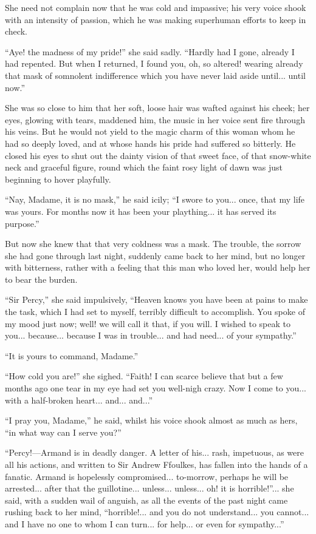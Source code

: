 \documentclass[paper=5.5in:8.5in,BCOR=7mm,twoside,DIV=calc,12pt,usegeometry,chapterprefix,endperiod,headings=big]{scrbook}
\begin{document}
She need not complain now that he was cold and impassive; his very voice shook with an intensity of passion, which he was making superhuman efforts to keep in check.

\enquote{Aye! the madness of my pride!} she said sadly. \enquote{Hardly had I gone, already I had repented. But when I returned, I found you, oh, so altered! wearing already that mask of somnolent indifference which you have never laid aside until... until now.}

She was so close to him that her soft, loose hair was wafted against his cheek; her eyes, glowing with tears, maddened him, the music in her voice sent fire through his veins. But he would not yield to the magic charm of this woman whom he had so deeply loved, and at whose hands his pride had suffered so bitterly. He closed his eyes to shut out the dainty vision of that sweet face, of that snow-white neck and graceful figure, round which the faint rosy light of dawn was just beginning to hover playfully.

\enquote{Nay, Madame, it is no mask,} he said icily; \enquote{I swore to you... once, that my life was yours. For months now it has been your plaything... it has served its purpose.}

But now she knew that that very coldness was a mask. The trouble, the sorrow she had gone through last night, suddenly came back to her mind, but no longer with bitterness, rather with a feeling that this man who loved her, would help her to bear the burden.

\enquote{Sir Percy,} she said impulsively, \enquote{Heaven knows you have been at pains to make the task, which I had set to myself, terribly difficult to accomplish. You spoke of my mood just now; well! we will call it that, if you will. I wished to speak to you... because... because I was in trouble... and had need... of your sympathy.}

\enquote{It is yours to command, Madame.}

\enquote{How cold you are!} she sighed. \enquote{Faith! I can scarce believe that but a few months ago one tear in my eye had set you well-nigh crazy. Now I come to you... with a half-broken heart... and... and...}

\enquote{I pray you, Madame,} he said, whilst his voice shook almost as much as hers, \enquote{in what way can I serve you?}

\enquote{Percy!---Armand is in deadly danger. A letter of his... rash, impetuous, as were all his actions, and written to Sir Andrew Ffoulkes, has fallen into the hands of a fanatic. Armand is hopelessly compromised... to-morrow, perhaps he will be arrested... after that the guillotine... unless... unless... oh! it is horrible!}... she said, with a sudden wail of anguish, as all the events of the past night came rushing back to her mind, \enquote{horrible!... and you do not understand... you cannot... and I have no one to whom I can turn... for help... or even for sympathy...}
\end{document}
